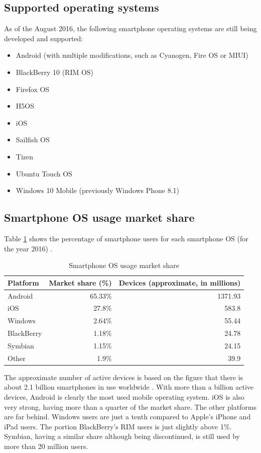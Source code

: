 \documentclass[english,master,public,dept460,male,cpdeclaration,oneside]{diploma}
\begin{document}
\subsection{Supported operating systems}
As of the August 2016, the following smartphone operating systems are still being developed and supported: 
\begin{itemize}
	\item Android (with multiple modifications, such as Cyanogen, Fire OS or MIUI)
	\item BlackBerry 10 (RIM OS)
	\item Firefox OS
	\item H5OS
	\item iOS
	\item Sailfish OS
	\item Tizen
	\item Ubuntu Touch OS
	\item Windows 10 Mobile (previously Windows Phone 8.1)
\end{itemize}

\subsection{Smartphone OS usage market share}
Table \ref{table:phonemarketshare} shows the percentage of smartphone users for each smartphone OS (for the year 2016) \cite{mosMarketShare}.

\begin{table}[hb]
	\centering
	\caption{Smartphone OS usage market share}
	\label{table:phonemarketshare}
	\begin{tabular}{l r r}
		\toprule		
		Platform & Market share (\%) & Devices (approximate, in millions) \\
		\midrule
		Android & 65.33\% & 1371.93 \\
		iOS & 27.8\% & 583.8 \\
		Windows & 2.64\% & 55.44 \\
		BlackBerry & 1.18\% & 24.78 \\
		Symbian & 1.15\% & 24.15\\
		Other & 1.9\% & 39.9\\
		\midrule
	\end{tabular}
\end{table}

The approximate number of active devices is based on the figure that there is about 2.1 billion smartphones in use worldwide \cite{noOfSmartphones}. With more than a billion active devices, Android is clearly the most used mobile operating system. iOS is also very strong, having more than a quarter of the market share. The other platforms are far behind. Windows users are just a tenth compared to Apple’s iPhone and iPad users. The portion BlackBerry’s RIM users is just slightly above 1\%. Symbian, having a similar share although being discontinued, is still used by more than 20 million users.
\end{document}
